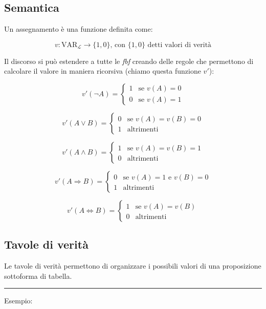 \documentclass{article}
\begin{document}
\subsection{Semantica}

Un assegnamento è una funzione definita come:

$$v:\text{VAR}_\mathcal{L}\rightarrow\{1,0\} \text{, \ \ con $\{1,0\}$ detti valori di verità}$$\newline

\noindent Il discorso si può estendere a tutte le \textit{fbf} creando delle regole che permettono di calcolare il valore in maniera ricorsiva (chiamo questa funzione $v'$):

\[
v'(\neg A) =
\begin{cases}
1 & \text{se } v(A)=0 \\
0 & \text{se } v(A)=1
\end{cases}
\]

\[
v'(A\lor B) =
\begin{cases}
0 & \text{se } v(A)=v(B)=0 \\
1 & \text{altrimenti}
\end{cases}
\]

\[
v'(A\land B) =
\begin{cases}
1 & \text{se } v(A)=v(B)=1 \\
0 & \text{altrimenti}
\end{cases}
\]

\[
v'(A\Rightarrow B) =
\begin{cases}
0 & \text{se } v(A)=1 \text{ e } v(B)=0 \\
1 & \text{altrimenti}
\end{cases}
\]

\[
v'(A\iff B) =
\begin{cases}
1 & \text{se } v(A)=v(B) \\
0 & \text{altrimenti}
\end{cases}
\]

\newpage

\subsection{Tavole di verità}

Le tavole di verità permettono di organizzare i possibili valori di una proposizione sottoforma di tabella.

\noindent\rule{\textwidth}{0.5pt}\newline

\noindent Esempio:\newline
\end{document}
